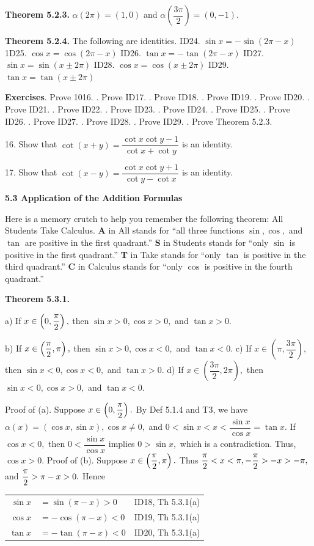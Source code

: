\textbf{Theorem 5.2.3.} $\alpha (2\pi)=(1,0)$ and $\alpha\left(\dfrac{3\pi}{2}\right) = (0,-1). $\nl

\textbf{Theorem 5.2.4.} The following are identities. \nl
ID24. $\sin x = -\sin(2\pi - x)$\nl
1D25. $\cos x = \cos( 2\pi - x)$\nl
ID26. $\tan x = -\tan( 2\pi - x)$\nl
ID27. $\sin x = \sin(x \pm 2\pi) $\nl
ID28. $\cos x = \cos(x \pm 2\pi)$\nl
ID29. $\tan x = \tan(x \pm 2\pi) $\nl
\newpage

\textbf{Exercises}. Prove 1016. . Prove ID17. . Prove ID18. . Prove ID19. . Prove ID20. . Prove ID21. . Prove ID22. . Prove ID23. . Prove ID24. . Prove ID25. . Prove ID26. . Prove ID27. . Prove ID28. . Prove ID29. . Prove Theorem 5.2.3. \nl

16. Show that $\cot (x + y) = \dfrac{\cot x \cot y - 1}{\cot x + \cot y}$ is an identity.\nl

17. Show that $\cot (x - y) = \dfrac{\cot x \cot y + 1}{\cot y - \cot x}$ is an identity.\nl

\textbf{5.3 Application of the Addition Formulas}\nl

Here is a memory crutch to help you remember the following theorem:\nl
All Students Take Calculus.\nl
\textbf{A} in All stands for ``all three functions $\sin, \cos,$ and $\tan$ are positive in the first quadrant.''\nl
\textbf{S} in Students stands for ``only $\sin$ is positive in the first quadrant.''\nl
\textbf{T} in Take stands for ``only $\tan$ is positive in the third quadrant.''\nl
\textbf{C} in Calculus stands for ``only $\cos$ is positive in the fourth quadrant.''\nl

\textbf{Theorem 5.3.1.}\nl

a) If $x\in \left(0, \dfrac{\pi}{2}\right),$ then $\sin x >0, \cos x > 0,$ and $\tan x > 0.$

b) 	If $x\in \left(\dfrac{\pi}{2},\pi\right),$ then $\sin x >0, \cos x < 0,$ and $\tan x < 0$. \nl
c) 	If $x\in\left(\pi,\dfrac{3\pi}{2}\right),$ then $\sin x < 0, \cos x < 0,$ and $\tan x > 0.$ \nl
d) 	If $x\in \left(\dfrac{3\pi}{2},2\pi\right),$ then $\sin x < 0, \cos x > 0,$ and $\tan x < 0.$ \nl

Proof of (a). Suppose $x\in \left(0, \dfrac{\pi}{2}\right).$ By Def 5.1.4 and T3, we have $\alpha(x) = (\cos x, \sin x), \cos x \neq 0, $ and $ 0 < \sin x < x < \dfrac{\sin x}{\cos x} = \tan x.$\nl
If $\cos x < 0,$ then $0 < \dfrac{\sin x}{\cos x}$ implies $0 > \sin x,$ which is a contradiction.  Thus, $\cos x > 0.$\nl
\newpage
Proof of (b). Suppose $x\in \left(\dfrac{\pi}{2}, \pi \right).$ Thus $\dfrac{\pi}{2} < x < \pi, -\dfrac{\pi}{2} > -x> -\pi,$ and
$\dfrac{\pi}{2} > \pi - x > 0.$ Hence\nl
\begin{tabular}{r l l}
$\sin x$&$= \sin(\pi - x) > 0$ &ID18, Th 5.3.1(a) \\
$\cos x$&$=-\cos(\pi - x) < 0$& ID19, Th 5.3.1(a)\\
$\tan x$&$= -\tan(\pi - x) < 0$& ID20, Th 5.3.1(a) \\
\end{tabular}\\

